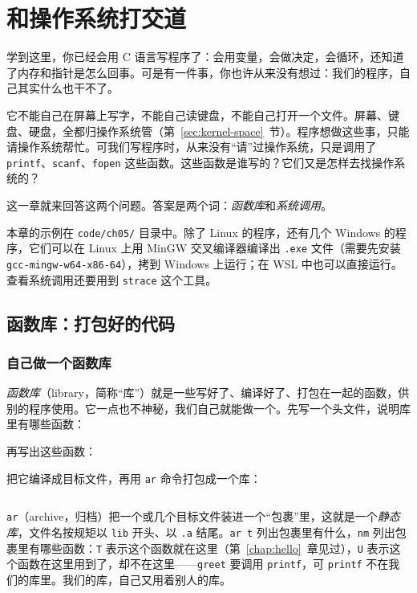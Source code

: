 \chapter{和操作系统打交道}
\label{chap:os}

学到这里，你已经会用 C 语言写程序了：会用变量，会做决定，会循环，还知道了内存和指针是怎么回事。可是有一件事，你也许从来没有想过：我们的程序，自己其实什么也干不了。

它不能自己在屏幕上写字，不能自己读键盘，不能自己打开一个文件。屏幕、键盘、硬盘，全都归操作系统管（第~\ref{sec:kernel-space}~节）。程序想做这些事，只能请操作系统帮忙。可我们写程序时，从来没有“请”过操作系统，只是调用了 \texttt{printf}、\texttt{scanf}、\texttt{fopen} 这些函数。这些函数是谁写的？它们又是怎样去找操作系统的？

这一章就来回答这两个问题。答案是两个词：\emph{函数库}和\emph{系统调用}。

本章的示例在 \texttt{code/ch05/} 目录中。除了 Linux 的程序，还有几个 Windows 的程序，它们可以在 Linux 上用 MinGW 交叉编译器编译出 \texttt{.exe} 文件（需要先安装 \texttt{gcc-mingw-w64-x86-64}），拷到 Windows 上运行；在 WSL 中也可以直接运行。查看系统调用还要用到 \texttt{strace} 这个工具。

\section{函数库：打包好的代码}
\label{sec:library}

\subsection{自己做一个函数库}

\emph{函数库}（library，简称“库”）就是一些写好了、编译好了、打包在一起的函数，供别的程序使用。它一点也不神秘，我们自己就能做一个。先写一个头文件，说明库里有哪些函数：


再写出这些函数：


把它编译成目标文件，再用 \texttt{ar} 命令打包成一个库：
\inputminted[linenos=false]{text}{code/ch05/out/build_lib.txt}

\texttt{ar}（archive，归档）把一个或几个目标文件装进一个“包裹”里，这就是一个\emph{静态库}，文件名按规矩以 \texttt{lib} 开头、以 \texttt{.a} 结尾。\texttt{ar t} 列出包裹里有什么，\texttt{nm} 列出包裹里有哪些函数：\texttt{T} 表示这个函数就在这里（第~\ref{chap:hello}~章见过），\texttt{U} 表示这个函数在这里用到了，却不在这里——\texttt{greet} 要调用 \texttt{printf}，可 \texttt{printf} 不在我们的库里。我们的库，自己又用着别人的库。

